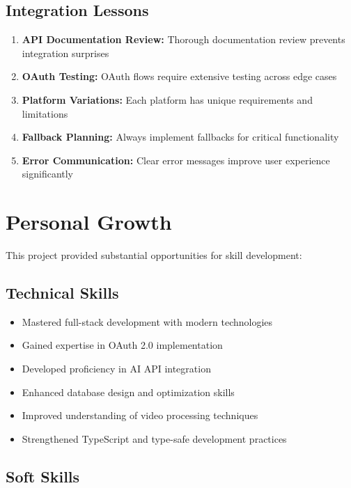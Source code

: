 \subsection{Integration Lessons}

\begin{enumerate}
    \item \textbf{API Documentation Review:} Thorough documentation review prevents integration surprises
    \item \textbf{OAuth Testing:} OAuth flows require extensive testing across edge cases
    \item \textbf{Platform Variations:} Each platform has unique requirements and limitations
    \item \textbf{Fallback Planning:} Always implement fallbacks for critical functionality
    \item \textbf{Error Communication:} Clear error messages improve user experience significantly
\end{enumerate}

\section{Personal Growth}

This project provided substantial opportunities for skill development:

\subsection{Technical Skills}

\begin{itemize}
    \item Mastered full-stack development with modern technologies
    \item Gained expertise in OAuth 2.0 implementation
    \item Developed proficiency in AI API integration
    \item Enhanced database design and optimization skills
    \item Improved understanding of video processing techniques
    \item Strengthened TypeScript and type-safe development practices
\end{itemize}

\subsection{Soft Skills}

